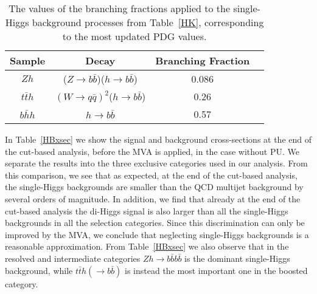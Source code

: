   \begin{table}[h]
\begin{center}
\begin{tabular}{|c|c|c|c|}
\hline
Sample & Decay & Branching Fraction\\
\hline\hline
$Zh$ & ($Z\to b\bar{b}$)($h\to b\bar{b}$) & 0.086 \\
$t\bar{t}h$ & $(W\to q\bar{q})^2$($h\to b\bar{b}$) & 0.26 \\
$b\bar{h}h$ & $h\to b\bar{b}$ & 0.57 \\
\hline
\end{tabular}
\caption{\small The values of the branching fractions applied to the single-Higgs
  background processes from Table~\ref{HK}, corresponding to
  the most updated PDG values. \label{HBF}}
\end{center}
  \end{table}%

  In Table~\ref{HBxsec}
  we show the signal and background cross-sections at the end of the cut-based analysis, before the MVA is applied,
  in the case without PU.
  We separate the results into the three exclusive categories used in our analysis.
  From this comparison, we see that as expected, at the end of the cut-based analysis, the single-Higgs
  backgrounds are smaller than the QCD multijet background by several orders of magnitude.
  In addition, we find that already at the end of the cut-based analysis the di-Higgs
  signal is also larger than all the single-Higgs backgrounds in all the selection categories.
  Since this discrimination can only be improved by the MVA, we
  conclude that neglecting single-Higgs backgrounds is a reasonable
  approximation.
%
  From Table~\ref{HBxsec} we also observe that in the resolved
  and intermediate categories $Zh\to b\bar{b}b\bar{b}$ is
  the dominant single-Higgs background, while $t\bar{t}h(\to b\bar{b})$ is
  instead the most important one in the boosted category.
  
